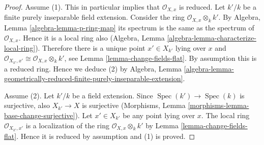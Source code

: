 \documentclass[10pt,a4paper]{amsart}
\theoremstyle{plain}
\theoremstyle{definition}
\theoremstyle{remark}
\numberwithin{equation}{subsection}
\def\Spec{\mathop{\mathrm{Spec}}}
\begin{document}
\begin{proof}
Assume (1). This in particular implies that $\mathcal{O}_{X, x}$
is reduced. Let $k'/k$ be a finite purely inseparable field
extension. Consider the ring $\mathcal{O}_{X, x} \otimes_k k'$.
By Algebra, Lemma \ref{algebra-lemma-p-ring-map}
its spectrum is the same as the spectrum of $\mathcal{O}_{X, x}$.
Hence it is a local ring also
(Algebra, Lemma \ref{algebra-lemma-characterize-local-ring}).
Therefore there is a unique point $x' \in X_{k'}$ lying over $x$
and $\mathcal{O}_{X_{k'}, x'} \cong \mathcal{O}_{X, x} \otimes_k k'$,
see Lemma \ref{lemma-change-fields-flat}.
By assumption this is a reduced ring. Hence we deduce (2) by
Algebra, Lemma
\ref{algebra-lemma-geometrically-reduced-finite-purely-inseparable-extension}.

\medskip\noindent
Assume (2). Let $k'/k$ be a field extension. Since
$\Spec(k') \to \Spec(k)$ is surjective, also
$X_{k'} \to X$ is surjective
(Morphisms, Lemma \ref{morphisms-lemma-base-change-surjective}).
Let $x' \in X_{k'}$ be any point lying over $x$.
The local ring $\mathcal{O}_{X_{k'}, x'}$
is a localization of the ring $\mathcal{O}_{X, x} \otimes_k k'$
by Lemma \ref{lemma-change-fields-flat}.
Hence it is reduced by assumption and (1) is proved.
\end{proof}
\end{document}
